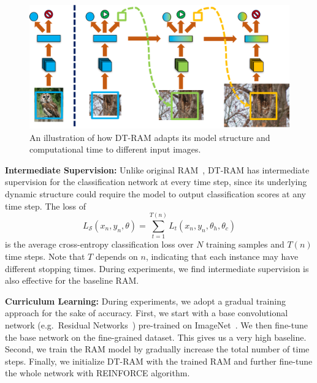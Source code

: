 \documentclass[10pt,twocolumn,letterpaper]{article}
\begin{document}
\setlength{\tabcolsep}{1pt}
\begin{figure}
\begin{center}
    \includegraphics[width=0.95\linewidth]{figs/model/dynamic_ram_inference}
\end{center}
\caption{An illustration of how DT-RAM adapts its model structure and computational time to different input images.}
\label{fig:DT-RAM-illustration}
\end{figure}

{\bf Intermediate Supervision:} Unlike original RAM~\cite{mnih2014recurrent}, DT-RAM has intermediate supervision for the classification network at every time step, since its underlying dynamic structure could require the model to output classification scores at any time step. The loss of
\begin{equation}
  L_{\mathcal{S}}(x_n, y_n, \theta) = \sum_{t=1}^{T(n)} L_t(x_n, y_n, \theta_h, \theta_c)
\end{equation}
is the average cross-entropy classification loss over $N$ training samples and $T(n)$ time steps.
Note that $T$ depends on $n$, indicating that each instance may have different stopping times.
During experiments, we find intermediate supervision is also effective for the baseline RAM.

{\bf Curriculum Learning:} During experiments, we adopt a gradual training approach for the sake of accuracy.
First, we start with a base convolutional network (e.g.\ Residual Networks~\cite{he2016deep}) pre-trained on ImageNet~\cite{deng2009imagenet}.
We then fine-tune the base network on the fine-grained dataset.
This gives us a very high baseline.
Second, we train the RAM model by gradually increase the total number of time steps.
Finally, we initialize DT-RAM with the trained RAM and further fine-tune the whole network with REINFORCE algorithm.

\end{document}
